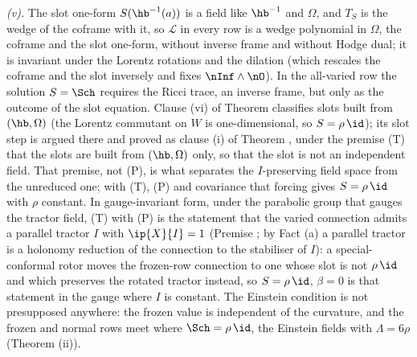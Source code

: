 \emph{(v).} The slot one-form $S(\hb^{-1}(a))$ is a field like $\hb^{-1}$ and $\Omega$, and $T_{S}$ is the wedge of the coframe with it, so $\mathcal{L}$ in every row is a wedge polynomial in $\Omega$, the coframe and the slot one-form, without inverse frame and without Hodge dual; it is invariant under the Lorentz rotations and the dilation (which rescales the coframe and the slot inversely and fixes $\nInf \wedge \nO$). In the all-varied row the solution $S = \Sch$ requires the Ricci trace, an inverse frame, but only as the outcome of the slot equation. Clause (vi) of Theorem  classifies slots built from $(\hb, \Omega)$ (the Lorentz commutant on $W$ is one-dimensional, so $S = \rho\,\id$); its slot step is argued there and proved as clause (i) of Theorem , under the premise (T) that the slots are built from $(\hb, \Omega)$ only, so that the slot is not an independent field. That premise, not (P), is what separates the $I$-preserving field space from the unreduced one; with (T), (P) and covariance that forcing gives $S = \rho\,\id$ with $\rho$ constant. In gauge-invariant form, under the parabolic group that gauges the tractor field, (T) with (P) is the statement that the varied connection admits a parallel tractor $I$ with $\ip{X}{I} = 1$ (Premise ; by Fact (a) a parallel tractor is a holonomy reduction of the connection to the stabiliser of $I$): a special-conformal rotor moves the frozen-row connection to one whose slot is not $\rho\,\id$ and which preserves the rotated tractor instead, so $S = \rho\,\id$, $\beta = 0$ is that statement in the gauge where $I$ is constant. The Einstein condition is not presupposed anywhere: the frozen value is independent of the curvature, and the frozen and normal rows meet where $\Sch = \rho\,\id$, the Einstein fields with $\Lambda = 6\rho$ (Theorem (ii)).

